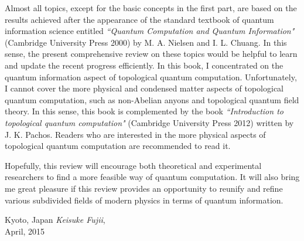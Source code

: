 Almost all topics, except for the basic concepts 
in the first part, are based on the results
achieved after the appearance of the standard textbook
of quantum information science
entitled {\it``Quantum Computation and Quantum Information"} (Cambridge University Press 2000) by M. A. Nielsen and I. L. Chuang.
In this sense, the present comprehensive review 
on these topics would be helpful to learn and update
the recent progress efficiently.
In this book, 
I concentrated on the quantum information aspect 
of topological quantum computation.
Unfortunately, I cannot cover 
the more physical and condensed matter aspects of 
topological quantum computation, such as non-Abelian anyons
and topological quantum field theory.
In this sense, this book is complemented by the book 
{\it``Introduction to topological quantum computation"}
(Cambridge University Press 2012)
written by J. K. Pachos.
Readers who are interested in the more physical aspects
of topological quantum computation are recommended to read it.

Hopefully, this review will encourage 
both theoretical and experimental
researchers to find a more feasible way of quantum computation.
It will also bring me great pleasure if this review provides 
an opportunity 
to reunify and refine
various subdivided fields of modern physics 
in terms of quantum information.







\vspace{\baselineskip}
\begin{flushright}\noindent
Kyoto, Japan
\hfill {\it Keisuke  Fujii}, \\
April, 2015
\\
\end{flushright}



